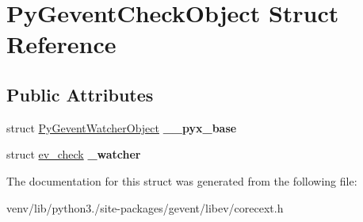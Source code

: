 \hypertarget{struct_py_gevent_check_object}{}\section{Py\+Gevent\+Check\+Object Struct Reference}
\label{struct_py_gevent_check_object}
\subsection*{Public Attributes}
\begin{DoxyCompactItemize}
\item 
\mbox{\label{struct_py_gevent_check_object_a7ae89f4ddeb64e0a41c9712ec8d66244}} 
struct \hyperlink{struct_py_gevent_watcher_object}{Py\+Gevent\+Watcher\+Object} {\bfseries \+\_\+\+\_\+pyx\+\_\+base}
\item 
\mbox{\label{struct_py_gevent_check_object_ab36303d666b0a9dbed3576406c125b93}} 
struct \hyperlink{structev__check}{ev\+\_\+check} {\bfseries \+\_\+watcher}
\end{DoxyCompactItemize}


The documentation for this struct was generated from the following file\+:\begin{DoxyCompactItemize}
\item 
venv/lib/python3./site-\/packages/gevent/libev/corecext.\+h\end{DoxyCompactItemize}
